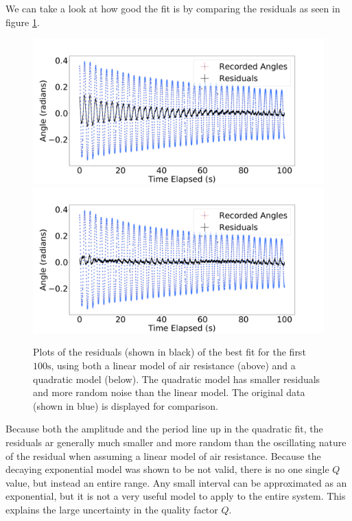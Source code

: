 \documentclass[%
 reprint,
 amsmath,amssymb
 aps,
]{revtex4-2}
\begin{document}
We can take a look at how good the fit is by comparing the residuals as seen in figure \ref{fig:residuals}.
\begin{figure}[h]
    \includegraphics[width=\linewidth]{figures/lin-residual-vs-time.png}
    \includegraphics[width=\linewidth]{figures/quad-residual-vs-time.png}

    \caption{Plots of the residuals (shown in black) of the best fit for the first $100\si{\second}$, using both a linear model of air resistance (above) and a quadratic model (below). The quadratic model has smaller residuals and more random noise than the linear model. The original data (shown in blue) is displayed for comparison.}
    \label{fig:residuals}
\end{figure}
Because both the amplitude and the period line up in the quadratic fit, the residuals ar generally much smaller and more random than the oscillating nature of the residual when assuming a linear model of air resistance. Because the decaying exponential model was shown to be not valid, there is no one single $Q$ value, but instead an entire range. Any small interval can be approximated as an exponential, but it is not a very useful model to apply to the entire system. This explains the large uncertainty in the quality factor $Q$.
\end{document}
